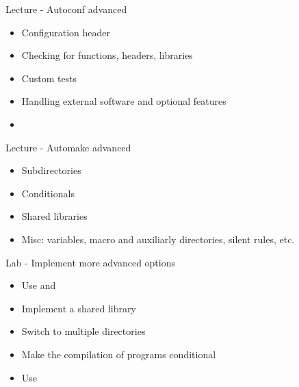\documentclass[a4paper,12pt,obeyspaces,spaces,hyphens]{article}
\begin{document}
\feagendatwocolumn
{Lecture - Autoconf advanced}
{
  \begin{itemize}
  \item Configuration header
  \item Checking for functions, headers, libraries
  \item Custom tests
  \item Handling external software and optional features
  \item {}
  \end{itemize}
}
{Lecture - Automake advanced}
{
  \begin{itemize}
  \item Subdirectories
  \item Conditionals
  \item Shared libraries
  \item Misc: variables, macro and auxiliarly directories, silent
    rules, etc.
  \end{itemize}
}

\feagendaonecolumn
{Lab - Implement more advanced options}
{
  \begin{itemize}
  \item Use  and 
  \item Implement a shared library
  \item Switch to multiple directories
  \item Make the compilation of programs conditional
  \item Use 
  \end{itemize}
}
\end{document}
